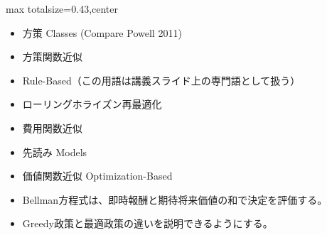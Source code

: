 \clearpage
{}
\begin{minipage}[t]{0.405\textwidth}
\begin{adjustbox}{max totalsize={\textwidth}{0.43\textheight},center}
\begin{minipage}{\textwidth}\scriptsize
{}\begin{itemize}
\item 方策 Classes (Compare Powell 2011)
\item 方策関数近似
\item Rule-Based（この用語は講義スライド上の専門語として扱う）
\item ローリングホライズン再最適化
\item 費用関数近似
\item 先読み Models
\item 価値関数近似 Optimization-Based
\end{itemize}\begin{itemize}
\item Bellman方程式は、即時報酬と期待将来価値の和で決定を評価する。
\item Greedy政策と最適政策の違いを説明できるようにする。
\end{itemize}
\end{minipage}
\end{adjustbox}
\end{minipage}\hfill
